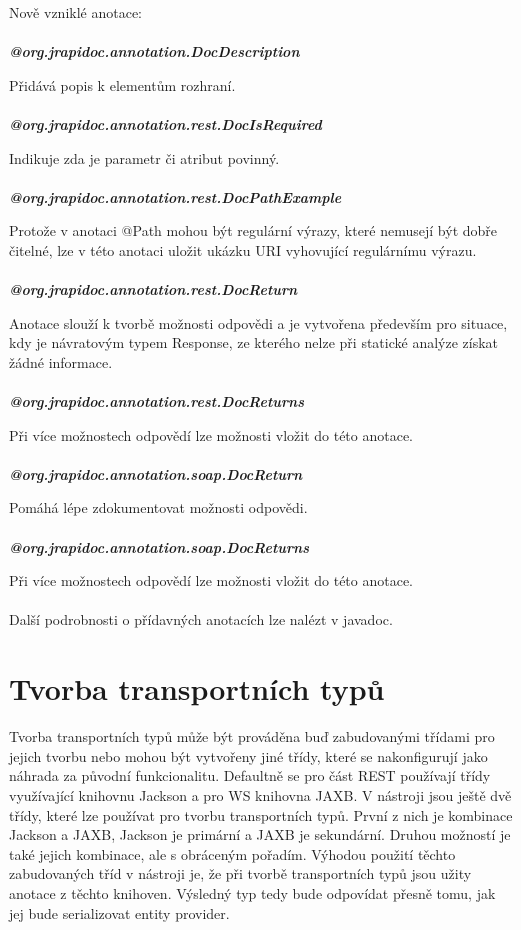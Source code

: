 \documentclass[11pt,twoside,a4paper]{book}
\begin{document}
Nově vzniklé anotace:
\mbox{}\\
\mbox{}\\
\textbf{\textit{@org.jrapidoc.annotation.DocDescription}}

Přidává popis k elementům rozhraní.
\mbox{}\\
\mbox{}\\
\textbf{\textit{@org.jrapidoc.annotation.rest.DocIsRequired}}

Indikuje zda je parametr či atribut povinný.
\mbox{}\\
\mbox{}\\
\textbf{\textit{@org.jrapidoc.annotation.rest.DocPathExample}}

Protože v anotaci @Path mohou být regulární výrazy, které nemusejí být dobře čitelné, lze v
této anotaci uložit ukázku URI vyhovující regulárnímu výrazu.
\mbox{}\\
\mbox{}\\
\textbf{\textit{@org.jrapidoc.annotation.rest.DocReturn}}

Anotace slouží k tvorbě možnosti odpovědi a je vytvořena především pro situace, kdy je
návratovým typem Response, ze kterého nelze při statické analýze získat žádné informace.
\mbox{}\\
\mbox{}\\
\textbf{\textit{@org.jrapidoc.annotation.rest.DocReturns}}

Při více možnostech odpovědí lze možnosti vložit do této anotace.
\mbox{}\\
\mbox{}\\
\textbf{\textit{@org.jrapidoc.annotation.soap.DocReturn}}

Pomáhá lépe zdokumentovat možnosti odpovědi.
\mbox{}\\
\mbox{}\\
\textbf{\textit{@org.jrapidoc.annotation.soap.DocReturns}}

Při více možnostech odpovědí lze možnosti vložit do této anotace.
\mbox{}\\
\mbox{}\\
Další podrobnosti o přídavných anotacích lze nalézt v javadoc.

\section{Tvorba transportních typů}

Tvorba transportních typů může být prováděna buď zabudovanými třídami pro jejich tvorbu
nebo mohou být vytvořeny jiné třídy, které se nakonfigurují jako náhrada za původní
funkcionalitu. Defaultně se pro část REST používají třídy využívající knihovnu Jackson a pro
WS knihovna JAXB. V nástroji jsou ještě dvě třídy, které lze používat pro tvorbu
transportních typů. První z nich je kombinace Jackson a JAXB, Jackson je primární a JAXB
je sekundární. Druhou možností je také jejich kombinace, ale s obráceným pořadím. Výhodou
použití těchto zabudovaných tříd v nástroji je, že při tvorbě transportních typů jsou užity
anotace z těchto knihoven. Výsledný typ tedy bude odpovídat přesně tomu, jak jej bude
serializovat entity provider.
\end{document}
